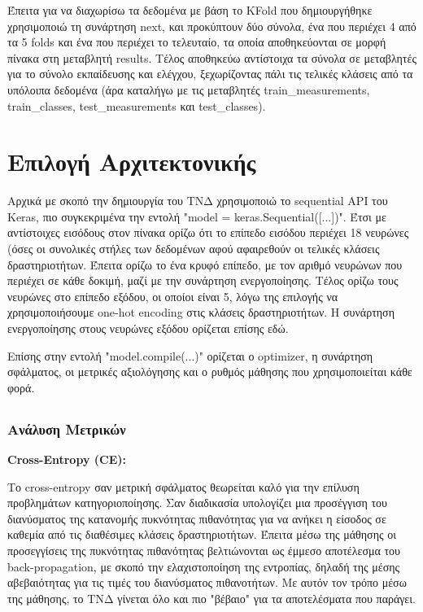 \documentclass[12pt,a4paper]{article}
\begin{document}
Έπειτα για να διαχωρίσω τα δεδομένα με βάση το KFold που δημιουργήθηκε χρησιμοποιώ τη συνάρτηση next, και προκύπτουν δύο σύνολα, ένα που περιέχει 4 από τα 5 folds και ένα που περιέχει το τελευταίο, τα οποία αποθηκεύονται σε μορφή πίνακα στη μεταβλητή results. Τέλος αποθηκεύω αντίστοιχα τα σύνολα σε μεταβλητές για το σύνολο εκπαίδευσης και ελέγχου, ξεχωρίζοντας πάλι τις τελικές κλάσεις από τα υπόλοιπα δεδομένα (άρα καταλήγω με τις μεταβλητές train\_measurements, train\_classes, test\_measurements και test\_classes).

\section{Επιλογή Αρχιτεκτονικής}
\label{Επιλογή Αρχιτεκτονικής}

Αρχικά με σκοπό την δημιουργία του ΤΝΔ χρησιμοποιώ το sequential API του Keras, πιο συγκεκριμένα την εντολή "model = keras.Sequential([...])". Έτσι με αντίστοιχες εισόδους στον πίνακα ορίζω ότι το επίπεδο εισόδου περιέχει 18 νευρώνες (όσες οι συνολικές στήλες των δεδομένων αφού αφαιρεθούν οι τελικές κλάσεις δραστηριοτήτων. Έπειτα ορίζω το ένα κρυφό επίπεδο, με τον αριθμό νευρώνων που περιέχει σε κάθε δοκιμή, μαζί με την συνάρτηση ενεργοποίησης. Τέλος ορίζω τους νευρώνες στο επίπεδο εξόδου, οι οποίοι είναι 5, λόγω της επιλογής να χρησιμοποιήσουμε one-hot encoding στις κλάσεις δραστηριοτήτων. Η συνάρτηση ενεργοποίησης στους νευρώνες εξόδου ορίζεται επίσης εδώ.

Επίσης στην εντολή "model.compile(...)" ορίζεται ο optimizer, η συνάρτηση σφάλματος, οι μετρικές αξιολόγησης και ο ρυθμός μάθησης που χρησιμοποιείται κάθε φορά.

\subsection{}

\subsubsection{Ανάλυση Μετρικών}
\label{Ανάλυση Μετρικών}

\textbf{Cross-Entropy (CE):}

Το cross-entropy σαν μετρική σφάλματος θεωρείται καλό για την επίλυση προβλημάτων κατηγοριοποίησης. Σαν διαδικασία υπολογίζει μια προσέγγιση του διανύσματος της κατανομής πυκνότητας πιθανότητας για να ανήκει η είσοδος σε καθεμία από τις διαθέσιμες κλάσεις δραστηριοτήτων. Έπειτα μέσω της μάθησης οι προσεγγίσεις της πυκνότητας πιθανότητας βελτιώνονται ως έμμεσο αποτέλεσμα του back-propagation, με σκοπό την ελαχιστοποίηση της εντροπίας, δηλαδή της μέσης αβεβαιότητας για τις τιμές του διανύσματος πιθανοτήτων. Με αυτόν τον τρόπο μέσω της μάθησης, το ΤΝΔ γίνεται όλο και πιο "βέβαιο" για τα αποτελέσματα που παράγει.
\end{document}
